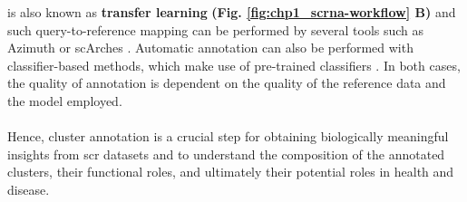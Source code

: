 is also known as \textbf{transfer learning} \textbf{(Fig. \ref{fig:chp1_scrna-workflow} B)} and such query-to-reference mapping can be performed by several tools such as Azimuth \textbf{\cite{hao_integrated_2021}} or scArches \textbf{\cite{lotfollahi_mapping_2021}}. Automatic annotation can also be performed with classifier-based methods, which make use of pre-trained classifiers \textbf{\cite{dominguez_conde_cross-tissue_2022,fu_clustifyr_2020}}. In both cases, the quality of annotation is dependent on the quality of the reference data and the model employed.\\\\
Hence, cluster annotation is a crucial step for obtaining biologically meaningful insights from \gls{scr} datasets and to understand the composition of the annotated clusters, their functional roles, and ultimately their potential roles in health and disease.


